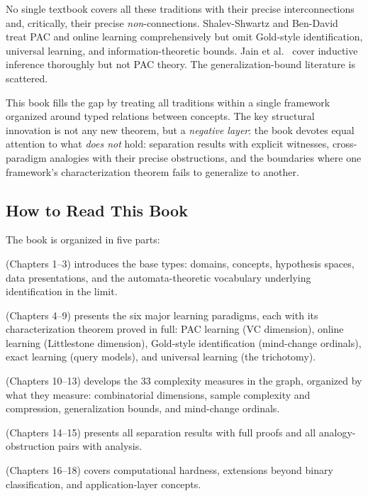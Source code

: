 \documentclass[11pt,a4paper,twoside,openright]{book}
\theoremstyle{definition}
\theoremstyle{plain}
\theoremstyle{remark}
\begin{document}
No single textbook covers all these traditions with their precise interconnections and, critically, their precise \emph{non}-connections. Shalev-Shwartz and Ben-David~\cite{ShalevShwartzBenDavid2014} treat PAC and online learning comprehensively but omit Gold-style identification, universal learning, and information-theoretic bounds. Jain et al.~\cite{JainOshersonRoyerSharma1999} cover inductive inference thoroughly but not PAC theory. The generalization-bound literature is scattered.

This book fills the gap by treating all traditions within a single framework organized around typed relations between concepts.  The key structural innovation is not any new theorem, but a \emph{negative layer}: the book devotes equal attention to what \emph{does not} hold: separation results with explicit witnesses, cross-paradigm analogies with their precise obstructions, and the boundaries where one framework's characterization theorem fails to generalize to another.

\subsection*{How to Read This Book}

The book is organized in five parts:

\begin{description}[leftmargin=*]
\item[Part I: Foundations] (Chapters 1--3) introduces the base types: domains, concepts, hypothesis spaces, data presentations, and the automata-theoretic vocabulary underlying identification in the limit.
\item[Part II: Paradigms] (Chapters 4--9) presents the six major learning paradigms, each with its characterization theorem proved in full: PAC learning (VC dimension), online learning (Littlestone dimension), Gold-style identification (mind-change ordinals), exact learning (query models), and universal learning (the trichotomy).
\item[Part III: Complexity Measures] (Chapters 10--13) develops the 33 complexity measures in the graph, organized by what they measure: combinatorial dimensions, sample complexity and compression, generalization bounds, and mind-change ordinals.
\item[Part IV: The Negative Layer] (Chapters 14--15) presents all separation results with full proofs and all analogy-obstruction pairs with analysis.
\item[Part V: Extensions] (Chapters 16--18) covers computational hardness, extensions beyond binary classification, and application-layer concepts.
\end{description}
\end{document}
